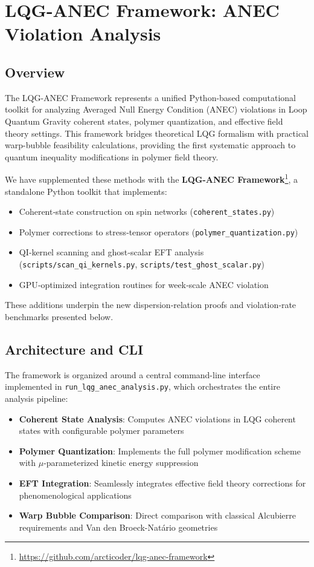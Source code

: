 \documentclass[11pt]{article}
\begin{document}
\section*{LQG-ANEC Framework: ANEC Violation Analysis}
\label{sec:lqg-anec-framework}

\subsection*{Overview}
The LQG-ANEC Framework represents a unified Python-based computational toolkit for analyzing Averaged Null Energy Condition (ANEC) violations in Loop Quantum Gravity coherent states, polymer quantization, and effective field theory settings. This framework bridges theoretical LQG formalism with practical warp-bubble feasibility calculations, providing the first systematic approach to quantum inequality modifications in polymer field theory.

We have supplemented these methods with the
\textbf{LQG-ANEC Framework}\footnote{\url{https://github.com/arcticoder/lqg-anec-framework}},
a standalone Python toolkit that implements:
\begin{itemize}
  \item Coherent‐state construction on spin networks (\texttt{coherent_states.py})
  \item Polymer corrections to stress‐tensor operators (\texttt{polymer_quantization.py})
  \item QI‐kernel scanning and ghost‐scalar EFT analysis (\texttt{scripts/scan_qi_kernels.py}, \texttt{scripts/test_ghost_scalar.py})
  \item GPU‐optimized integration routines for week‐scale ANEC violation
\end{itemize}
These additions underpin the new dispersion‐relation proofs and violation‐rate benchmarks presented below.

\subsection{Architecture and CLI}

The framework is organized around a central command-line interface implemented in \texttt{run\_lqg\_anec\_analysis.py}, which orchestrates the entire analysis pipeline:

\begin{itemize}
\item \textbf{Coherent State Analysis}: Computes ANEC violations in LQG coherent states with configurable polymer parameters
\item \textbf{Polymer Quantization}: Implements the full polymer modification scheme with $\mu$-parameterized kinetic energy suppression
\item \textbf{EFT Integration}: Seamlessly integrates effective field theory corrections for phenomenological applications
\item \textbf{Warp Bubble Comparison}: Direct comparison with classical Alcubierre requirements and Van den Broeck-Natário geometries
\end{itemize}
\end{document}
